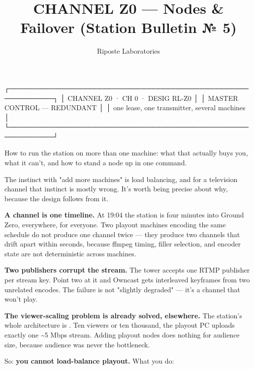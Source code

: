 \documentclass[fontpath=fonts/,logopath=logo/]{riposte-doc}
\title{CHANNEL Z0 — Nodes \& Failover (Station Bulletin № 5)}
\author{Riposte Laboratories}
\date{}
\begin{document}
\ripmakehead

\riptoc

\ripcodeopen
{}
\begin{ripcodeblock}
┌───────────────────────────────────────────────────────────┐
│   CHANNEL Z0 · CH 0 · DESIG RL-Z0                         │
│   MASTER CONTROL — REDUNDANT                              │
│   one lease, one transmitter, several machines            │
└───────────────────────────────────────────────────────────┘
\end{ripcodeblock}
\ripcodesizereset\ripcodeclose

How to run the station on more than one machine: what that actually buys you, what it can't, and how to stand a node up in one command.



The instinct with "add more machines" is load balancing, and for a television channel that instinct is mostly wrong. It's worth being precise about why, because the design follows from it.

\textbf{A channel is one timeline.} At 19:04 the station is four minutes into Ground Zero, everywhere, for everyone. Two playout machines encoding the same schedule do not produce one channel twice — they produce two  channels that drift apart within seconds, because ffmpeg timing, filler selection, and encoder state are not deterministic across machines.

\textbf{Two publishers corrupt the stream.} The tower accepts one RTMP publisher per stream key. Point two at it and Owncast gets interleaved keyframes from two unrelated encodes. The failure is not "slightly degraded" — it's a channel that won't play.

\textbf{The viewer-scaling problem is already solved, elsewhere.} The station's whole architecture is . Ten viewers or ten thousand, the playout PC uploads exactly one \textasciitilde{}5 Mbps stream. Adding playout nodes does nothing for audience size, because audience was never the bottleneck.

So: \textbf{you cannot load-balance playout.} What you  do:
\end{document}

